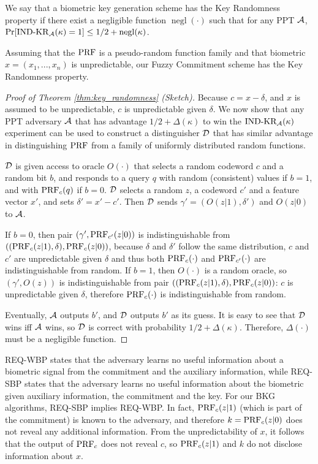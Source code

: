 \begin{definition}
We say that a biometric key generation scheme has the Key Randomness property if there exist a negligible function $\operatorname{negl}(\cdot)$ such that for any PPT $\mathcal{A}$, $\operatorname{Pr}[\operatorname{IND-KR}_\mathcal{A}(\kappa) = 1] \leq 1/2+\operatorname{negl}(\kappa)$.
\end{definition}

\begin{theorem} \label{thm:key_randomness}
Assuming that the $\operatorname{PRF}$ is a pseudo-random function family and that biometric $x = (x_1, ..., x_n)$ is unpredictable, our Fuzzy Commitment scheme has the Key Randomness property.
\label{thm:REQ-KR}
\end{theorem}

\begin{proof}[Proof of Theorem \ref{thm:key_randomness} (Sketch)]
%
Because $c = x - \delta$, and $x$ is assumed to be unpredictable, $c$ is unpredictable given $\delta$. We now show that any PPT adversary $\mathcal{A}$ that has advantage $1/2+\Delta(\kappa)$ to win the $\operatorname{IND-KR_\mathcal{A}(\kappa)}$ experiment can be used to construct a distinguisher $\mathcal{D}$ that has similar advantage in distinguishing $\operatorname{PRF}$ from a family of uniformly distributed random functions.

$\mathcal{D}$ is given access to oracle $O(\cdot)$ that selects a random codeword $c$ and a random bit $b$, and responds to a query $q$ with random (consistent) values if $b=1$, and with $\operatorname{PRF}_c(q)$ if $b=0$. 
$\mathcal{D}$ selects a random $z$, a codeword $c'$ and a feature vector $x'$, and sets $\delta' = x' - c'$. Then $\mathcal{D}$ sends $\gamma' = (O(z|1), \delta')$ and $O(z|0)$ to $\mathcal{A}$. %

%
If $b=0$, then pair $(\gamma', \operatorname{PRF}_{c'}(z|0))$ is indistinguishable from $((\operatorname{PRF}_{c}(z|1), \delta), \operatorname{PRF}_{c}(z|0))$, because $\delta$ and $\delta'$ follow the same distribution, $c$ and $c'$ are unpredictable given $\delta$ and thus both $\operatorname{PRF}_{c}(\cdot)$ and $\operatorname{PRF}_{c'}(\cdot)$ are indistinguishable from random. 
If $b=1$, then $O(\cdot)$ is a random oracle, so $(\gamma', O(z))$ is 
indistinguishable from pair $((\operatorname{PRF}_c(z|1), \delta), \operatorname{PRF}_c(z|0))$: $c$ is 
unpredictable given $\delta$,  therefore $\operatorname{PRF}_c(\cdot)$ is indistinguishable from 
random. 
 
Eventually, $\mathcal{A}$ outputs $b'$, and $\mathcal{D}$ outputs  $b'$ as its guess. It is easy to see that $\mathcal{D}$ wins iff $\mathcal{A}$ wins, so $\mathcal{D}$ is correct with probability $1/2+\Delta(\kappa)$. Therefore,  $\Delta(\cdot)$ must be a negligible function.\end{proof}

REQ-WBP states that the adversary learns no useful information about a biometric 
signal from the commitment and the auxiliary information, while REQ-SBP states 
that the adversary learns no useful information about the biometric given 
auxiliary information, the commitment and the key.
For our BKG algorithms, REQ-SBP implies REQ-WBP. In fact, $\operatorname{PRF}_c(z|1)$ (which is part of the commitment) is known to the adversary, and therefore $k=\operatorname{PRF}_c(z|0)$ does not reveal any additional information. %
%
%
From the unpredictability of $x$, it follows that the output of $\operatorname{PRF}_c$ does not reveal $c$, so $\operatorname{PRF}_c(z|1)$ and $k$ do not disclose information about $x$. 

